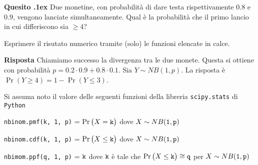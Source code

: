 \documentclass[11pt,twoside,a4paper]{article}
\newcounter{quesito}
\newenvironment{question}{\addtocounter{quesito}{1}\par\textbf{Quesito \thequesito.\kern1ex}}{\vspace{0.5\parskip}}
\newenvironment{answer}{\par\textbf{Risposta\quad}}{\vspace{\parskip}}
\begin{document}
\begin{question}
Due monetine, con probabilità di dare testa rispettivamente $0.8$ e $0.9$, vengono lanciate simultaneamente. Qual è la probabilità che il primo lancio in cui differiscono sia $\ge 4$? 

Esprimere il risutato numerico tramite (solo) le funzioni elencate in calce.
\begin{answer}
Chiamiamo successo la divergenza tra le due monete. Questa si ottiene con probabilità $p=0.2\cdot0.9+0.8\cdot0.1$. Sia $Y\sim NB(1,p)$. La risposta è $\Pr(Y\ge 4)=1-\Pr(Y\le 3)$.
\end{answer}
\end{question}

\vfill
\hrulefill

Si assuma noto il valore delle seguenti funzioni della libreria {\tt scipy.stats\/} di  {\tt Python\/}

{\tt nbinom.pmf(k, 1, p)} = $\Pr\big(X={\tt k}\big)$ dove $X\sim NB({\tt 1},{\tt p})$ 

{\tt nbinom.cdf(k, 1, p)} = $\Pr\big(X\le{\tt k}\big)$ dove  $X\sim NB({\tt 1},{\tt p})$ 

{\tt nbimom.ppf(q, 1, p)} = ${\tt k}$ dove ${\tt k}$ è tale che $\Pr\big(X\le{\tt k}\big)\cong{\tt q}$ per $X\sim NB({\tt 1},{\tt p})$ 
\end{document}
